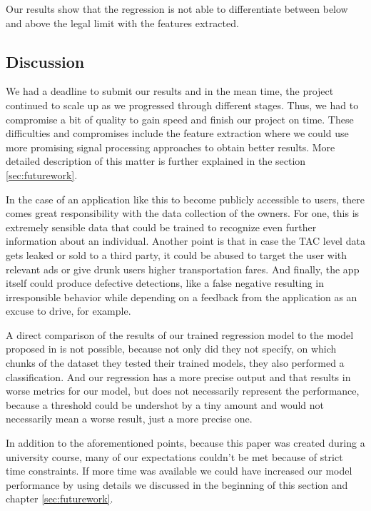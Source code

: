 Our results show that the regression is not able to differentiate between below and above the legal limit with the features extracted.

\subsection{Discussion}
We had a deadline to submit our results and in the mean time, the project continued to scale up as we progressed through different stages.
Thus, we had to compromise a bit of quality to gain speed and finish our project on time. These difficulties and compromises include the feature extraction where we could use more promising signal processing approaches to obtain better results.
More detailed description of this matter is further explained in the section \ref{sec:futurework}.

In the case of an application like this to become publicly accessible to users, there comes great responsibility with the data collection of the owners.
For one, this is extremely sensible data that could be trained to recognize even further information about an individual.
Another point is that in case the TAC level data gets leaked or sold to a third party, it could be abused to target the user with relevant ads or give drunk users higher transportation fares.
And finally, the app itself could produce defective detections, like a false negative resulting in irresponsible behavior while depending on a feedback from the application as an excuse to drive, for example.       

A direct comparison of the results of our trained regression model to the model proposed in \cite{DBLP:conf/ijcai/KillianPNMC19} is not possible, because not only did they not specify, on which chunks of the dataset they tested their trained models, they also performed a classification. And our regression has a more precise output and that results in worse metrics for our model, but does not necessarily represent the performance, because a threshold could be undershot by a tiny amount and would not necessarily mean a worse result, just a more precise one.

In addition to the aforementioned points, because this paper was created during a university course, many of our expectations couldn't be met because of strict time constraints.
If more time was available we could have increased our model performance by using details we discussed in the beginning of this section and chapter \ref{sec:futurework}.

